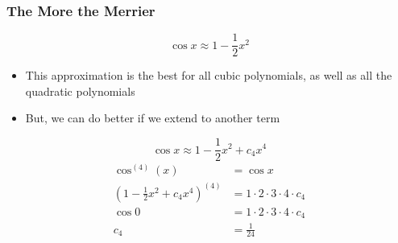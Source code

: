 \documentclass{beamer}
\begin{document}
\begin{frame}
  \frametitle{The More the Merrier}
  \begin{equation*}
    \cos x \approx 1 - \frac{1}{2}x^2
  \end{equation*}
  \begin{itemize}
    \item This approximation is the best for all cubic polynomials, as well as all the quadratic polynomials
    \item But, we can do better if we extend to another term
  \end{itemize}
  \begin{equation*}
    \cos x \approx 1 - \frac{1}{2}x^2 + c_4x^4
  \end{equation*}
  \begin{align*}
    \cos^{(4)}(x) &= \cos x \\
    \left(1 - \frac{1}{2}x^2 + c_4x^4\right)^{(4)} &= 1 \cdot 2 \cdot 3 \cdot 4 \cdot c_4 \\
    \cos 0 & = 1 \cdot 2 \cdot 3 \cdot 4 \cdot c_4 \\
    c_4 & = \frac{1}{24}
  \end{align*}
\end{frame}

\end{document}
